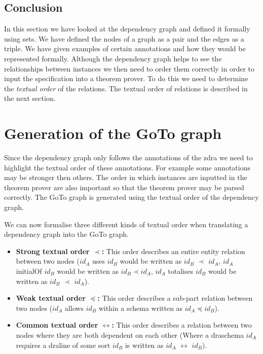\subsection{Conclusion}

In this section we have looked at the dependency graph and defined it formally
using sets. We have defined the nodes of a graph as a pair and the edges as a
triple. We have given examples of certain annotations and how they would be
represented formally. Although the dependency graph helps to see the
relationships between instances we then need to order them correctly in order to
input the specification into a theorem prover. To do this we need to determine
the \emph{textual order} of the relations. The textual order of relations is
described in the next section.

\section{Generation of the GoTo graph}

Since the dependency graph only follows the annotations of the \gls{zdra} we
need to highlight the textual order of these annotations. For example some
annotations may be stronger then others. The order in which instances are
inputted in the theorem prover are also important so that the theorem prover may
be parsed correctly. The GoTo graph is generated using the textual order of the
dependency graph.

\begin{defin} We can now formalise three different kinds of
textual order when translating a dependency graph into the GoTo graph.

\begin{itemize}
\item \textbf{Strong textual order $\prec$:} This order describes an entire
entity relation between two nodes ($id_{A}$ uses $id_{B}$ would be written as
$id_{B}$ $\prec$ $id_{A}$, $id_{A}$ initialOf $id_{B}$ would be written as
$id_{B} \prec id_{A}$, $id_{A}$ totalises $id_{B}$ would be written as $id_{B}$
$\prec$ $id_{A}$).

\item \textbf{Weak textual order $\preceq$:} This order describes a sub-part
relation between two nodes ($id_{A}$ allows $id_{B}$ within a schema written as
$id_{A} \preceq id_{B}$).

\item \textbf{Common textual order $\leftrightarrow$:} This order describes a
relation between two nodes where they are both dependent on each other (Where a
draschema $id_{A}$ requires a draline of some sort $id_{B}$ is written as
$id_{A}$ $\leftrightarrow$ $id_{B}$).
\end{itemize}
\end{defin}

